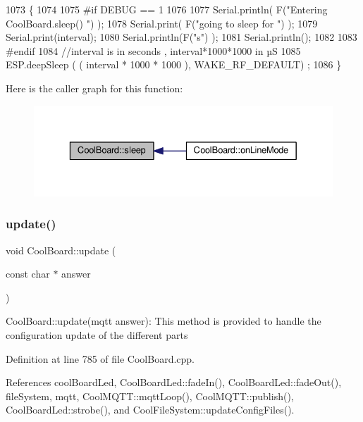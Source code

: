 \begin{DoxyCode}
1073 \{
1074 
1075 \textcolor{preprocessor}{#if DEBUG == 1}
1076 
1077     Serial.println( F(\textcolor{stringliteral}{"Entering CoolBoard.sleep() "}) );
1078     Serial.print( F(\textcolor{stringliteral}{"going to sleep for "}) );
1079     Serial.print(interval);
1080     Serial.println(F(\textcolor{stringliteral}{"s"}) );
1081     Serial.println();
1082 
1083 \textcolor{preprocessor}{#endif}
1084     \textcolor{comment}{//interval is in seconds , interval*1000*1000 in µS}
1085     ESP.deepSleep ( ( interval * 1000 * 1000 ), WAKE\_RF\_DEFAULT) ;
1086 \}
\end{DoxyCode}
Here is the caller graph for this function\+:
\nopagebreak
\begin{figure}[H]
\begin{center}
\leavevmode
\includegraphics[width=329pt]{classCoolBoard_a069952cdcb2e7f68518aa429eceadb6e_icgraph}
\end{center}
\end{figure}
\mbox{\label{classCoolBoard_a8612756d3f73198cdde857a66f0fe690}} 
\subsubsection{\texorpdfstring{update()}{update()}}
{\footnotesize\ttfamily void Cool\+Board\+::update (\begin{DoxyParamCaption}\item[{const char $\ast$}]{answer }\end{DoxyParamCaption})}

Cool\+Board\+::update(mqtt answer)\+: This method is provided to handle the configuration update of the different parts 

Definition at line 785 of file Cool\+Board.\+cpp.



References cool\+Board\+Led, Cool\+Board\+Led\+::fade\+In(), Cool\+Board\+Led\+::fade\+Out(), file\+System, mqtt, Cool\+M\+Q\+T\+T\+::mqtt\+Loop(), Cool\+M\+Q\+T\+T\+::publish(), Cool\+Board\+Led\+::strobe(), and Cool\+File\+System\+::update\+Config\+Files().



